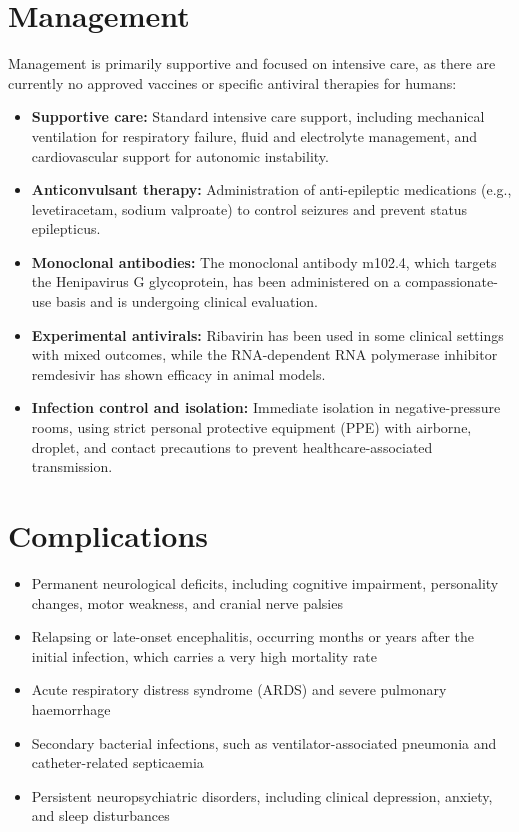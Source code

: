 \section*{Management}
Management is primarily supportive and focused on intensive care, as there are currently no approved vaccines or specific antiviral therapies for humans:
\begin{itemize}
    \item \textbf{Supportive care:} Standard intensive care support, including mechanical ventilation for respiratory failure, fluid and electrolyte management, and cardiovascular support for autonomic instability.
    \item \textbf{Anticonvulsant therapy:} Administration of anti-epileptic medications (e.g., levetiracetam, sodium valproate) to control seizures and prevent status epilepticus.
    \item \textbf{Monoclonal antibodies:} The monoclonal antibody m102.4, which targets the Henipavirus G glycoprotein, has been administered on a compassionate-use basis and is undergoing clinical evaluation.
    \item \textbf{Experimental antivirals:} Ribavirin has been used in some clinical settings with mixed outcomes, while the RNA-dependent RNA polymerase inhibitor remdesivir has shown efficacy in animal models.
    \item \textbf{Infection control and isolation:} Immediate isolation in negative-pressure rooms, using strict personal protective equipment (PPE) with airborne, droplet, and contact precautions to prevent healthcare-associated transmission.
\end{itemize}

\section*{Complications}
\begin{itemize}
    \item Permanent neurological deficits, including cognitive impairment, personality changes, motor weakness, and cranial nerve palsies
    \item Relapsing or late-onset encephalitis, occurring months or years after the initial infection, which carries a very high mortality rate
    \item Acute respiratory distress syndrome (ARDS) and severe pulmonary haemorrhage
    \item Secondary bacterial infections, such as ventilator-associated pneumonia and catheter-related septicaemia
    \item Persistent neuropsychiatric disorders, including clinical depression, anxiety, and sleep disturbances
\end{itemize}

